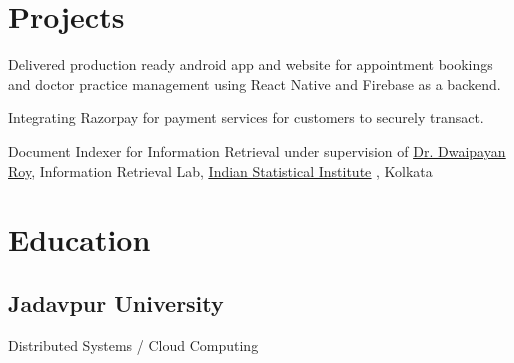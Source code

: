 \documentclass[]{deedy-resume-reversed}
\begin{document}
\newpage
\begin{multicols}{2}
\justifying


\needspace{8cm}
\section{Projects}

\needspace{2.5cm}
\vspace{\topsep} %

\begin{tightemize}
\item Delivered production ready android app and website for appointment bookings and doctor practice management using React Native and Firebase as a backend.
\item Integrating Razorpay for payment services for customers to securely transact.
\end{tightemize}
\sectionsep

\needspace{2cm}
\begin{tightemize}
\item Document Indexer for Information Retrieval under supervision of \href{https://dwaipayanroy.github.io/}{\underline{Dr. Dwaipayan Roy}}, Information Retrieval Lab, \href{https://en.wikipedia.org/wiki/Indian_Statistical_Institute}{\underline{Indian Statistical Institute}} , Kolkata
\end{tightemize}
\sectionsep


\needspace{2cm}
\section{Education}

\needspace{2cm}
\vspace{\topsep} %

\subsection{Jadavpur University}
Distributed Systems / Cloud Computing \\
\sectionsep


\end{multicols}
\end{document}
